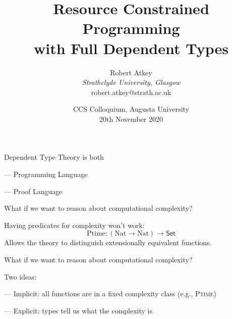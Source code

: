 \documentclass[xetex,serif,mathserif,aspectratio=169]{beamer}
\title{Resource Constrained Programming \\ with Full Dependent Types}
\author{Robert Atkey \\
  \emph{Strathclyde University, Glasgow} \\
  robert.atkey@strath.ac.uk}
\date{CCS Colloquium, Augusta University\\ 20th November 2020}
\newcommand{\youtem}{\quad \textcolor{titlered!80}{---} \quad}
\newcommand{\HEAD}[1]{\textcolor{titlered}{#1}}
\begin{document}
\frame{\titlepage}





\begin{frame}

  \HEAD{Dependent Type Theory is both}

  \bigskip

  \youtem Programming Language

  \raggedleft {}

  \raggedright

  \medskip

  \youtem Proof Language

  \raggedleft {}


  \pause \pause \pause

\end{frame}

\begin{frame}

  What if we want to reason about computational complexity?

  \pause
  \bigskip

  Having predicates for complexity won't work:
  \begin{displaymath}
    \mathrm{Ptime} : (\mathrm{Nat} \to \mathrm{Nat}) \to \mathsf{Set}
  \end{displaymath}
  Allows the theory to distinguish extensionally equivalent functions.

\end{frame}

\begin{frame}

  What if we want to reason about computational complexity?

  \pause
  \bigskip

  Two ideas:

  \medskip

  \youtem Implicit: all functions are in a fixed complexity class (e.g., \textsc{Ptime})

  \medskip

  \youtem Explicit: types tell us what the complexity is.

\end{frame}
\end{document}

